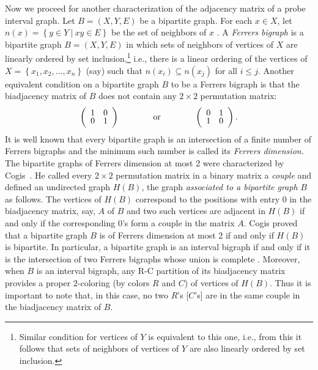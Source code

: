 \documentclass[secthm]{elsart}
\newcommand{\set}[1]{\left\{#1\right\}}
\newcommand{\Set}[2]{\set{#1\ \vert\ #2}}
\begin{document}
Now we proceed for another characterization of the adjacency matrix of a probe interval graph. Let $B=(X,Y,E)$ be a bipartite graph. For each $x\in X$, let $n(x)=\Set{y\in Y}{xy\in E}$ be the set of neighbors of $x$ . A {\em Ferrers bigraph} \cite{R} is a bipartite graph $B=(X,Y,E)$ in which sets of neighbors of vertices of $X$ are linearly ordered by set inclusion,\footnote{Similar condition for vertices of $Y$ is equivalent to this one, i.e., from this it follows that sets of neighbors of vertices of $Y$ are also linearly ordered by set inclusion.} i.e., there is a linear ordering of the vertices of $X=\set{x_1,x_2,\ldots ,x_n}$ (say) such that $n(x_i)\subseteq n(x_j)$ for all $i\leqslant j$. Another equivalent condition \cite{R} on a bipartite graph $B$ to be a Ferrers bigraph is that the biadjacency matrix of $B$ does not contain any $2\times2$ permutation matrix: 
$$\left(\begin{array}{cc}
1 & 0\\[-0.25em]
0 & 1
\end{array}
\right) \hspace{0.5in}
\textrm{ or } \hspace{0.5in}\left(\begin{array}{cc}
0 & 1\\[-0.25em]
1 & 0
\end{array}
\right).$$
It is well known that every bipartite graph is an intersection of a finite number of Ferrers bigraphs and the minimum such number is called its {\em Ferrers dimension}. The bipartite graphs of Ferrers dimension at most 2 were characterized by Cogis~\cite{C}. He called every $2\times2$ permutation matrix in a binary matrix a {\em couple} and defined an undirected graph $H(B)$, the graph {\em associated to a bipartite graph} $B$ as follows. The vertices of $H(B)$ correspond to the positions with entry $0$ in the biadjacency matrix, say, $A$ of $B$ and two such vertices are adjacent in $H(B)$ if and only if the corresponding $0$'s form a couple in the matrix $A$. Cogis proved that a bipartite graph $B$ is of Ferrers dimension at most 2 if and only if $H(B)$ is bipartite. In particular, a bipartite graph is an interval bigraph if and only if it is the intersection of two Ferrers bigraphs whose union is complete \cite{SDRW}. Moreover, when $B$ is an interval bigraph, any R-C partition of its biadjacency matrix provides a proper $2$-coloring (by colors $R$ and $C$) of vertices of $H(B)$. Thus it is important to note that, in this case, no two $R$'s [$C$'s] are in the same couple in the biadjacency matrix of $B$. 
\end{document}
